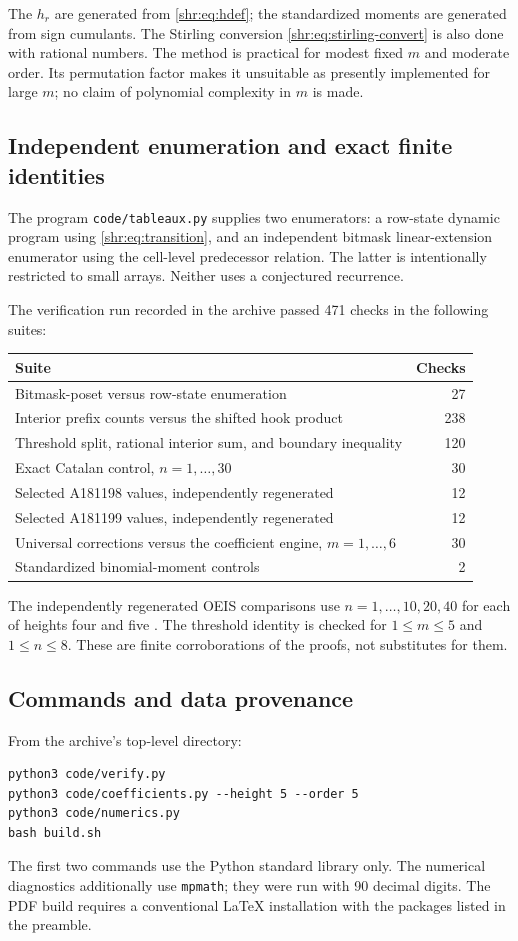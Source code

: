 \documentclass[11pt,letterpaper]{article}
\numberwithin{equation}{section}
\theoremstyle{definition}
\newcommand{\1}{\mathbf 1}
\begin{document}
The $h_r$ are generated from \eqref{shr:eq:hdef}; the standardized moments are
generated from sign cumulants. The Stirling conversion
\eqref{shr:eq:stirling-convert} is also done with rational numbers. The method
is practical for modest fixed $m$ and moderate order. Its permutation
factor makes it unsuitable as presently implemented for large $m$;
no claim of polynomial complexity in $m$ is made.

\subsection{Independent enumeration and exact finite identities}
The program \texttt{code/tableaux.py} supplies two enumerators: a row-state
dynamic program using \eqref{shr:eq:transition}, and an independent bitmask
linear-extension enumerator using the cell-level predecessor relation.
The latter is intentionally restricted to small arrays. Neither uses a
conjectured recurrence.

The verification run recorded in the archive passed 471 checks in the
following suites:
\begin{center}
\begin{tabular}{p{}r}
\toprule
Suite & Checks\\
\midrule
Bitmask-poset versus row-state enumeration & 27\\
Interior prefix counts versus the shifted hook product & 238\\
Threshold split, rational interior sum, and boundary inequality & 120\\
Exact Catalan control, $n=1,\ldots,30$ & 30\\
Selected A181198 values, independently regenerated & 12\\
Selected A181199 values, independently regenerated & 12\\
Universal corrections versus the coefficient engine, $m=1,\ldots,6$ & 30\\
Standardized binomial-moment controls & 2\\
\bottomrule
\end{tabular}
\end{center}
The independently regenerated OEIS comparisons use $n=1,\ldots,10,20,40$
for each of heights four and five \cite{b198,b199}. The threshold identity
is checked for $1\le m\le5$ and $1\le n\le8$.
These are finite corroborations of the proofs, not substitutes for them.

\subsection{Commands and data provenance}
From the archive's top-level directory:
\begin{verbatim}
python3 code/verify.py
python3 code/coefficients.py --height 5 --order 5
python3 code/numerics.py
bash build.sh
\end{verbatim}
The first two commands use the Python standard library only.
The numerical diagnostics additionally use \texttt{mpmath}; they were run
with 90 decimal digits. The PDF build requires a conventional LaTeX
installation with the packages listed in the preamble.
\end{document}
